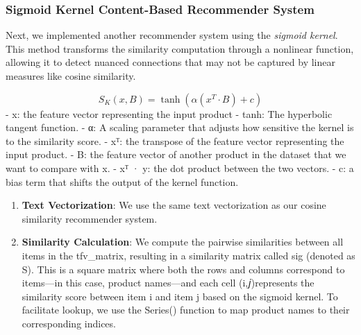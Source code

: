 \documentclass[
]{article}
\begin{document}
\subsubsection{Sigmoid Kernel Content-Based Recommender
System}\label{sigmoid-kernel-content-based-recommender-system}

Next, we implemented another recommender system using the \emph{sigmoid
kernel}. This method transforms the similarity computation through a
nonlinear function, allowing it to detect nuanced connections that may
not be captured by linear measures like cosine similarity.

\[S_K(x, B) = \tanh(\alpha (x^T \cdot B) + c)\] - x: the feature vector
representing the input product - tanh: The hyperbolic tangent function.
- α: A scaling parameter that adjusts how sensitive the kernel is to the
similarity score. - xᵀ: the transpose of the feature vector representing
the input product. - B: the feature vector of another product in the
dataset that we want to compare with x. - xᵀ · y: the dot product
between the two vectors. - c: a bias term that shifts the output of the
kernel function.

\begin{enumerate}
\def\labelenumi{\arabic{enumi}.}
\item
  \textbf{Text Vectorization}: We use the same text vectorization as our
  cosine similarity recommender system.
\item
  \textbf{Similarity Calculation}: We compute the pairwise similarities
  between all items in the tfv\_matrix, resulting in a similarity matrix
  called sig (denoted as S). This is a square matrix where both the rows
  and columns correspond to items---in this case, product names---and
  each cell (i,𝑗)represents the similarity score between item i and item
  j based on the sigmoid kernel. To facilitate lookup, we use the
  Series() function to map product names to their corresponding indices.
\end{enumerate}
\end{document}
